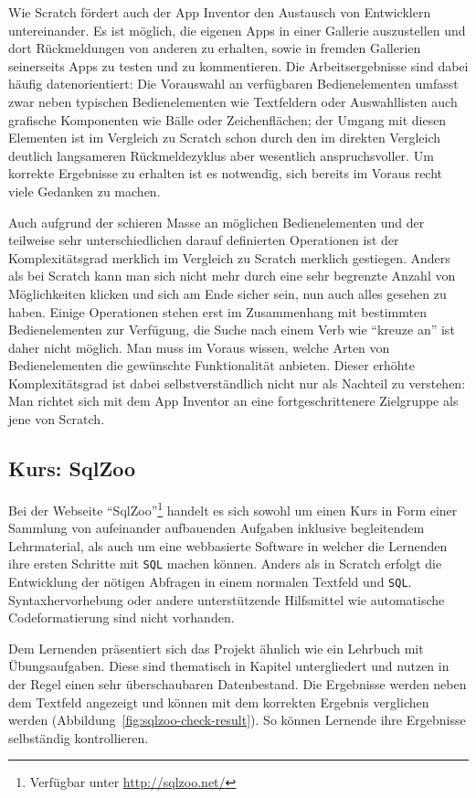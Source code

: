 Wie Scratch fördert auch der App Inventor den Austausch von Entwicklern untereinander. Es ist möglich, die eigenen Apps in einer Gallerie auszustellen und dort Rückmeldungen von anderen zu erhalten, sowie in fremden Gallerien seinerseits Apps zu testen und zu kommentieren. Die Arbeitsergebnisse sind dabei häufig datenorientiert: Die Vorauswahl an verfügbaren Bedienelementen umfasst zwar neben typischen Bedienelementen wie Textfeldern oder Auswahllisten auch grafische Komponenten wie Bälle oder Zeichenflächen; der Umgang mit diesen Elementen ist im Vergleich zu Scratch schon durch den im direkten Vergleich deutlich langsameren Rückmeldezyklus aber wesentlich anspruchsvoller. Um korrekte Ergebnisse zu erhalten ist es notwendig, sich bereits im Voraus recht viele Gedanken zu machen.

Auch aufgrund der schieren Masse an möglichen Bedienelementen und der teilweise sehr unterschiedlichen darauf definierten Operationen ist der Komplexitätsgrad merklich im Vergleich zu Scratch merklich gestiegen. Anders als bei Scratch kann man sich nicht mehr durch eine sehr begrenzte Anzahl von Möglichkeiten klicken und sich am Ende sicher sein, nun auch alles gesehen zu haben. Einige Operationen stehen erst im Zusammenhang mit bestimmten Bedienelementen zur Verfügung, die Suche nach einem Verb wie "`kreuze an"' ist daher nicht möglich. Man muss im Voraus wissen, welche Arten von Bedienelementen die gewünschte Funktionalität anbieten. Dieser erhöhte Komplexitätsgrad ist dabei selbstverständlich nicht nur als Nachteil zu verstehen: Man richtet sich mit dem App Inventor an eine fortgeschrittenere Zielgruppe als jene von Scratch.

\subsection{Kurs: SqlZoo}

Bei der Webseite "`SqlZoo"'\footnote{Verfügbar unter \url{http://sqlzoo.net/}} handelt es sich sowohl um einen Kurs in Form einer Sammlung von aufeinander aufbauenden Aufgaben inklusive begleitendem Lehrmaterial, als auch um eine webbasierte Software in welcher die Lernenden ihre ersten Schritte mit \texttt{SQL} machen können. Anders als in Scratch erfolgt die Entwicklung der nötigen Abfragen in einem normalen Textfeld und \texttt{SQL}. Syntaxhervorhebung oder andere unterstützende Hilfsmittel wie automatische Codeformatierung sind nicht vorhanden.

Dem Lernenden präsentiert sich das Projekt ähnlich wie ein Lehrbuch mit Übungsaufgaben. Diese sind thematisch in Kapitel untergliedert und nutzen in der Regel einen sehr überschaubaren Datenbestand. Die Ergebnisse werden neben dem Textfeld angezeigt und können mit dem korrekten Ergebnis verglichen werden (Abbildung~\ref{fig:sqlzoo-check-result}). So können Lernende ihre Ergebnisse selbständig kontrollieren.

